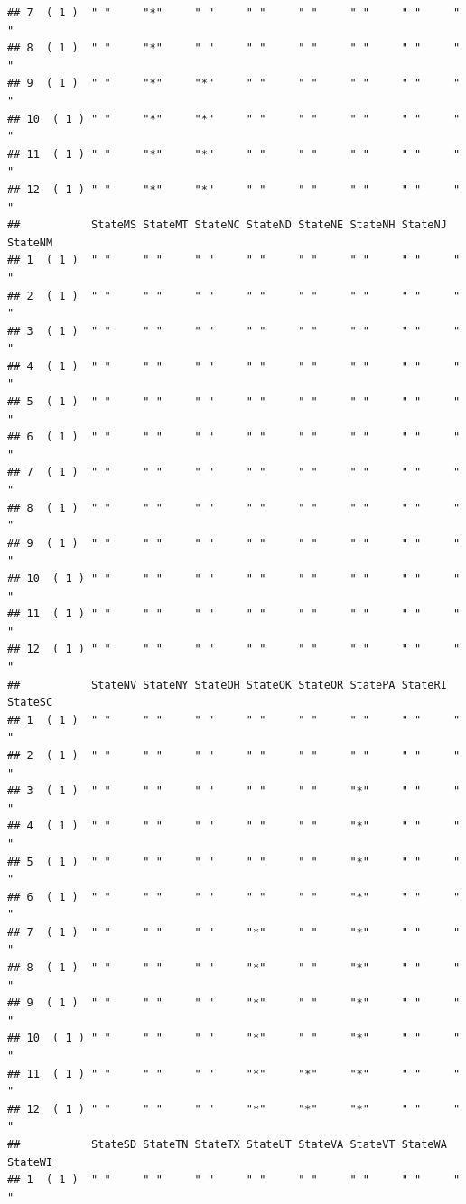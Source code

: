 \documentclass[]{article}
\begin{document}
\begin{verbatim}
## 7  ( 1 )  " "     "*"     " "     " "     " "     " "     " "     " "    
## 8  ( 1 )  " "     "*"     " "     " "     " "     " "     " "     " "    
## 9  ( 1 )  " "     "*"     "*"     " "     " "     " "     " "     " "    
## 10  ( 1 ) " "     "*"     "*"     " "     " "     " "     " "     " "    
## 11  ( 1 ) " "     "*"     "*"     " "     " "     " "     " "     " "    
## 12  ( 1 ) " "     "*"     "*"     " "     " "     " "     " "     " "    
##           StateMS StateMT StateNC StateND StateNE StateNH StateNJ StateNM
## 1  ( 1 )  " "     " "     " "     " "     " "     " "     " "     " "    
## 2  ( 1 )  " "     " "     " "     " "     " "     " "     " "     " "    
## 3  ( 1 )  " "     " "     " "     " "     " "     " "     " "     " "    
## 4  ( 1 )  " "     " "     " "     " "     " "     " "     " "     " "    
## 5  ( 1 )  " "     " "     " "     " "     " "     " "     " "     " "    
## 6  ( 1 )  " "     " "     " "     " "     " "     " "     " "     " "    
## 7  ( 1 )  " "     " "     " "     " "     " "     " "     " "     " "    
## 8  ( 1 )  " "     " "     " "     " "     " "     " "     " "     " "    
## 9  ( 1 )  " "     " "     " "     " "     " "     " "     " "     " "    
## 10  ( 1 ) " "     " "     " "     " "     " "     " "     " "     " "    
## 11  ( 1 ) " "     " "     " "     " "     " "     " "     " "     " "    
## 12  ( 1 ) " "     " "     " "     " "     " "     " "     " "     " "    
##           StateNV StateNY StateOH StateOK StateOR StatePA StateRI StateSC
## 1  ( 1 )  " "     " "     " "     " "     " "     " "     " "     " "    
## 2  ( 1 )  " "     " "     " "     " "     " "     " "     " "     " "    
## 3  ( 1 )  " "     " "     " "     " "     " "     "*"     " "     " "    
## 4  ( 1 )  " "     " "     " "     " "     " "     "*"     " "     " "    
## 5  ( 1 )  " "     " "     " "     " "     " "     "*"     " "     " "    
## 6  ( 1 )  " "     " "     " "     " "     " "     "*"     " "     " "    
## 7  ( 1 )  " "     " "     " "     "*"     " "     "*"     " "     " "    
## 8  ( 1 )  " "     " "     " "     "*"     " "     "*"     " "     " "    
## 9  ( 1 )  " "     " "     " "     "*"     " "     "*"     " "     " "    
## 10  ( 1 ) " "     " "     " "     "*"     " "     "*"     " "     " "    
## 11  ( 1 ) " "     " "     " "     "*"     "*"     "*"     " "     " "    
## 12  ( 1 ) " "     " "     " "     "*"     "*"     "*"     " "     " "    
##           StateSD StateTN StateTX StateUT StateVA StateVT StateWA StateWI
## 1  ( 1 )  " "     " "     " "     " "     " "     " "     " "     " "    

\end{verbatim}
\end{document}
